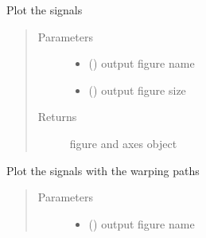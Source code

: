 \documentclass[letterpaper,10pt,english]{sphinxmanual}
\begin{document}
\begin{fulllineitems}
\begin{fulllineitems}
\label{\detokenize{modules/dtw_analysis:dtwhaclustering.dtw_analysis.dtw_signal_pairs.plot_signals}}
\sphinxAtStartPar
Plot the signals
\begin{quote}\begin{description}
\item[{Parameters}] \leavevmode\begin{itemize}
\item {} 
\sphinxAtStartPar
{} () \textendash{} output figure name

\item {} 
\sphinxAtStartPar
{} () \textendash{} output figure size

\end{itemize}

\item[{Returns}] \leavevmode
\sphinxAtStartPar
figure and axes object

\end{description}\end{quote}

\end{fulllineitems}


\begin{fulllineitems}
\label{\detokenize{modules/dtw_analysis:dtwhaclustering.dtw_analysis.dtw_signal_pairs.plot_warping_path}}
\sphinxAtStartPar
Plot the signals with the warping paths
\begin{quote}\begin{description}
\item[{Parameters}] \leavevmode\begin{itemize}
\item {} 
\sphinxAtStartPar
{} () \textendash{} output figure name


\end{itemize}
\end{description}
\end{quote}
\end{fulllineitems}
\end{fulllineitems}
\end{document}
